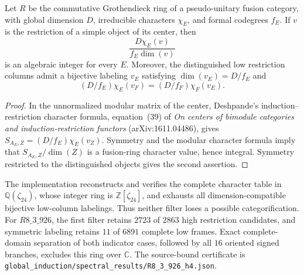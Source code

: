 \begin{proposition}
Let $R$ be the commutative Grothendieck ring of a pseudo-unitary fusion
category, with global dimension $D$, irreducible characters $\chi_E$,
and formal codegrees $f_E$. If $v$ is the restriction of a simple object
of its center, then
\[
 \frac{D\chi_E(v)}{f_E\dim(v)}
\]
is an algebraic integer for every $E$. Moreover, the distinguished low
restriction columns admit a bijective labeling $v_E$ satisfying
$\dim(v_E)=D/f_E$ and
\[
 (D/f_E)\chi_E(v_F)=(D/f_F)\chi_F(v_E).
\]
\end{proposition}
\begin{proof}
In the unnormalized modular matrix of the center, Deshpande's
induction--restriction character formula, equation~(39) of
\emph{On centers of bimodule categories and induction-restriction
functors} (arXiv:1611.04486), gives
$S_{A_E,Z}=(D/f_E)\chi_E(v_Z)$. Symmetry and the modular character
formula imply that $S_{A_E,Z}/\dim(Z)$ is a fusion-ring character
value, hence integral. Symmetry restricted to the distinguished
objects gives the second assertion.
\end{proof}

The implementation reconstructs and verifies the complete character
table in $\mathbb Q(\zeta_{24})$, whose integer ring is
$\mathbb Z[\zeta_{24}]$, and exhausts all dimension-compatible
bijective low-column labelings. Thus neither filter loses a possible
categorification. For $R8\_3\_926$, the first filter retains $2723$ of
$2863$ high restriction candidates, and symmetric labeling retains
$11$ of $6891$ complete low frames. Exact complete-domain separation
of both indicator cases, followed by all $16$ oriented signed
branches, excludes this ring over $\mathbb C$. The source-bound
certificate is \texttt{global\_induction/spectral\_results/R8\_3\_926\_h4.json}.
